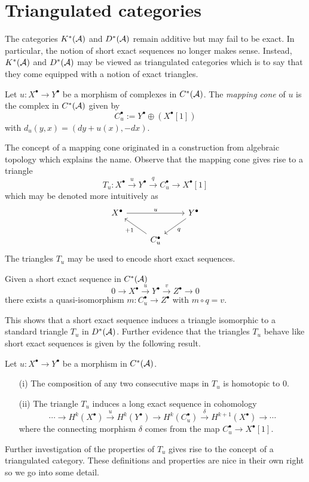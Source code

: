\section{Triangulated categories}
The categories $K^*(\AA)$ and $D^*(\AA)$ remain additive but may fail to be exact.
In particular, the notion of short exact sequences no longer makes sense.
Instead, $K^*(\AA)$ and $D^*(\AA)$ may be viewed as triangulated categories which is to say that they come equipped with a notion of exact triangles.
\begin{definition}
 Let $u:X^\bullet \to Y^\bullet$ be a morphism of complexes in $C^*(\AA)$.
 The {\it mapping cone} of $u$ is the complex in $C^*(\AA)$ given by
 $$C_u^\bullet := Y^\bullet \oplus (X^\bullet[1]) $$
 with $d_u(y,x)= (dy + u(x) , -dx)$.
\end{definition}
The concept of a mapping cone originated in a construction from algebraic topology which explains the name.
Observe that the mapping cone gives rise to a triangle
$$T_u:X^\bullet \xrightarrow{u} Y^\bullet \xrightarrow{q} C_u^\bullet \to X^\bullet[1]$$
which may be denoted more intuitively as
$$
 \begin{tikzcd}
   X^\bullet \arrow{rr}{u}& & Y^\bullet \arrow{dl}{q}\\
   & C_u^\bullet\arrow{lu}{+1}
 \end{tikzcd}
$$
The triangles $T_u$ may be used to encode short exact sequences.
\begin{proposition}{\cite[Proposition 1.1.23.]{dimca2004sheaves}}\label{prop: SESYieldsTriangle}
Given a short exact sequence in $C^*(\AA)$
$$0 \to X^\bullet \xrightarrow{u} Y^\bullet \xrightarrow{v} Z^\bullet \to 0 $$
there exists a quasi-isomorphism $m:C_u^\bullet \to Z^\bullet$ with $m\circ q = v$.
\end{proposition}
This shows that a short exact sequence induces a triangle isomorphic to a standard triangle $T_u$ in $D^*(\AA)$.
Further evidence that the triangles $T_u$ behave like short exact sequences is given by the following result.
\begin{proposition}{\cite[Lemma 1.1.20, Proposition 1.1.21]{dimca2004sheaves}}
 Let $u:X^\bullet \to Y^\bullet$ be a morphism in $C^*(\AA)$.
 \begin{enumerate}
   \item[(i)] The composition of any two consecutive maps in $T_u$ is homotopic to $0$.
   \item[(ii)] The triangle $T_u$ induces a long exact sequence in cohomology
   $$\cdots \to H^k(X^\bullet) \xrightarrow{u} H^k(Y^\bullet) \to H^k(C_u^\bullet) \xrightarrow{\delta} H^{k+1}(X^\bullet) \to \cdots$$
   where the connecting morphism $\delta$ comes from the map $C_u^\bullet \to X^\bullet[1]$.
 \end{enumerate}
\end{proposition}
Further investigation of the properties of $T_u$ gives rise to the concept of a triangulated category.
These definitions and properties are nice in their own right so we go into some detail.

